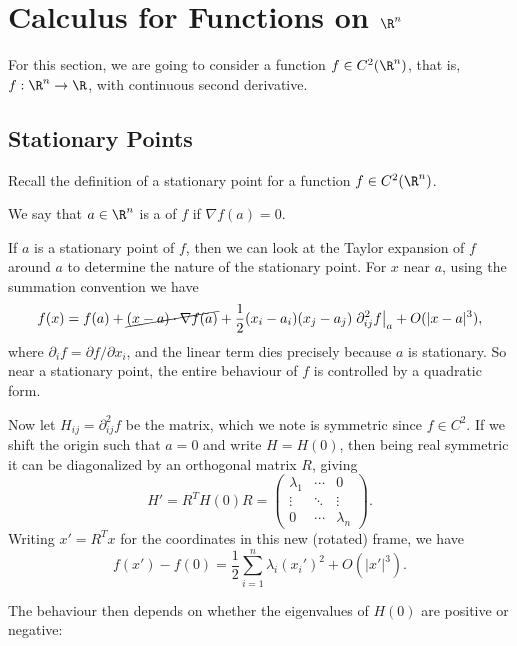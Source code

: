 
\section{Calculus for Functions on \texorpdfstring{$\R^n$}{R-n}}

For this section, we are going to consider a function $f \in C^2(\R^n)$, that is, $f: \R^n \rightarrow \R$, with continuous second derivative.

\subsection{Stationary Points}

Recall the definition of a stationary point for a function $f \in C^2(\R^n)$.

\begin{definition}
	We say that $a \in \R^n$ is a  of $f$ if
	$\nabla f(a)= 0$.
\end{definition}

If $a$ is a stationary point of $f$, then we can look at the Taylor expansion of $f$ around $a$ to determine the nature of the stationary point. For $x$ near $a$, using the summation convention we have
$$
f(x) = f(a) + \cancel{(x - a) \cdot \nabla f(a)} + \frac{1}{2}(x_i - a_i)(x_j - a_j) \left.\partial^2_{ij} f \right|_a + O(|x - a|^3),
$$
where $\partial_i f = \partial f/\partial x_i$, and the linear term dies precisely because $a$ is stationary. So near a stationary point, the entire behaviour of $f$ is controlled by a quadratic form.

Now let $H_{ij} = \partial^2_{ij} f$ be the  matrix, which we note is symmetric since $f \in C^2$. If we shift the origin such that $a = 0$ and write $H = H(0)$, then being real symmetric it can be diagonalized by an orthogonal matrix $R$, giving
$$
H' = R^T H(0) R = \begin{pmatrix}
	\lambda_1 & \cdots & 0 \\
	\vdots& \ddots &\vdots \\
	0 &\cdots & \lambda_n
\end{pmatrix}.
$$
Writing $x' = R^T x$ for the coordinates in this new (rotated) frame, we have
$$
	f(x') - f(0) = \frac{1}{2}\sum_{i = 1}^n \lambda_i (x_i')^2 + O(|x'|^3).
$$

The behaviour then depends on whether the eigenvalues of $H(0)$ are positive or negative:

